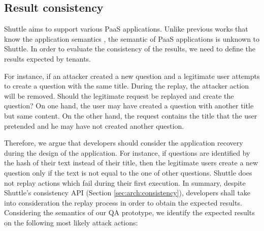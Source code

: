 \subsection{Result consistency}\label{sec:eval:accuracy:consistency}
Shuttle aims to support various \ac{PaaS} applications. Unlike previous works that know the application semantics \cite{undoForOperators}, the semantic of \ac{PaaS} applications is unknown to Shuttle. In order to evaluate the consistency of the results, we need to define the results expected by tenants. 

For instance, if an attacker created a new question and a legitimate user attempts to create a question with the same title. During the replay, the attacker action will be removed. Should the legitimate request be replayed and create the question? On one hand, the user may have created a question with another title but same content. On the other hand, the request contains the title that the user pretended and he may have not created another question. 

Therefore, we argue that developers should consider the application recovery during the design of the application. For instance, if questions are identified by the hash of their text instead of their title, then the legitimate users create a new question only if the text is not equal to the one of other questions. Shuttle does not replay actions which fail during their first execution. In summary, despite Shuttle's consistency \ac{API} (Section \ref{sec:arch:consistency}), developers shall take into consideration the replay process in order to obtain the expected results.\\


Considering the semantics of our \ac{QA} prototype, we identify the expected results on the following most likely attack actions:

